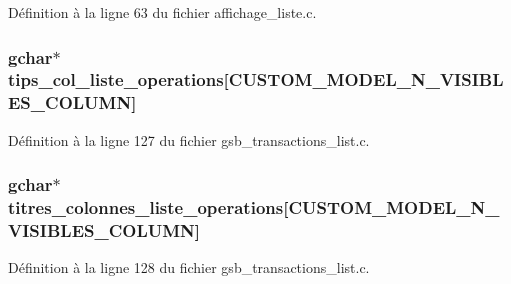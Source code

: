 Définition à la ligne 63 du fichier affichage\_\-liste.c.

\subsubsection[{tips\_\-col\_\-liste\_\-operations}]{\setlength{\rightskip}{0pt plus 5cm}gchar$\ast$ {\bf tips\_\-col\_\-liste\_\-operations}[CUSTOM\_\-MODEL\_\-N\_\-VISIBLES\_\-COLUMN]}\label{affichage__liste_8c_a7d49023563c9144cf16b6b4c2b65ce05}


Définition à la ligne 127 du fichier gsb\_\-transactions\_\-list.c.

\subsubsection[{titres\_\-colonnes\_\-liste\_\-operations}]{\setlength{\rightskip}{0pt plus 5cm}gchar$\ast$ {\bf titres\_\-colonnes\_\-liste\_\-operations}[CUSTOM\_\-MODEL\_\-N\_\-VISIBLES\_\-COLUMN]}\label{affichage__liste_8c_abe5a25ede887e60c7f679c9ff03607f0}


Définition à la ligne 128 du fichier gsb\_\-transactions\_\-list.c.


